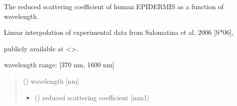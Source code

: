 \documentclass[letterpaper,10pt,english]{sphinxmanual}
\begin{document}
\begin{fulllineitems}
\label{\detokenize{04_scattering_coefficient:skinoptics.scattering_coefficient.rmus_EP_Salomatina}}
\pysigstartsignatures
{}
\pysigstopsignatures
\begin{DUlineblock}{0em}
\item[] The reduced scattering coefficient of human EPIDERMIS as a function of wavelength.
\item[] Linear interpolation of experimental data from Salomatina et al. 2006 {[}S*06{]},
\item[] publicly available at \textless{}\textgreater{}.
\end{DUlineblock}

\begin{DUlineblock}{0em}
\item[] wavelength range: {[}370 nm, 1600 nm{]}
\end{DUlineblock}
\begin{quote}\begin{description}
\sphinxAtStartPar
{} () \textendash{} wavelength {[}nm{]}

\sphinxAtStartPar
\begin{itemize}
\item {} 
\sphinxAtStartPar
{} () \textendash{} reduced scattering coefficient {[}mm\sphinxhyphen{}1{]}

\end{itemize}


\end{description}\end{quote}

\end{fulllineitems}

\end{document}
